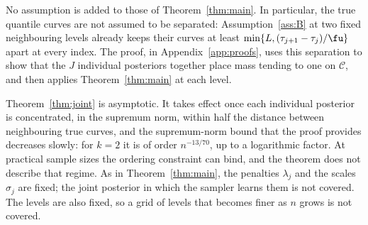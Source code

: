No assumption is added to those of Theorem~\ref{thm:main}. In particular, the true quantile curves are not assumed to be separated: Assumption~\ref{ass:B} at two fixed neighbouring levels already keeps their curves at least $\min\{L,(\tau_{j+1}-\tau_j)/\fu\}$ apart at every index. The proof, in Appendix~\ref{app:proofs}, uses this separation to show that the $J$ individual posteriors together place mass tending to one on $\mathcal C$, and then applies Theorem~\ref{thm:main} at each level.

\begin{remark}[Scope]
Theorem~\ref{thm:joint} is asymptotic. It takes effect once each individual posterior is concentrated, in the supremum norm, within half the distance between neighbouring true curves, and the supremum-norm bound that the proof provides decreases slowly: for $k=2$ it is of order $n^{-13/70}$, up to a logarithmic factor. At practical sample sizes the ordering constraint can bind, and the theorem does not describe that regime. As in Theorem~\ref{thm:main}, the penalties $\lambda_j$ and the scales $\sigma_j$ are fixed; the joint posterior in which the sampler learns them is not covered. The levels are also fixed, so a grid of levels that becomes finer as $n$ grows is not covered.
\end{remark}
